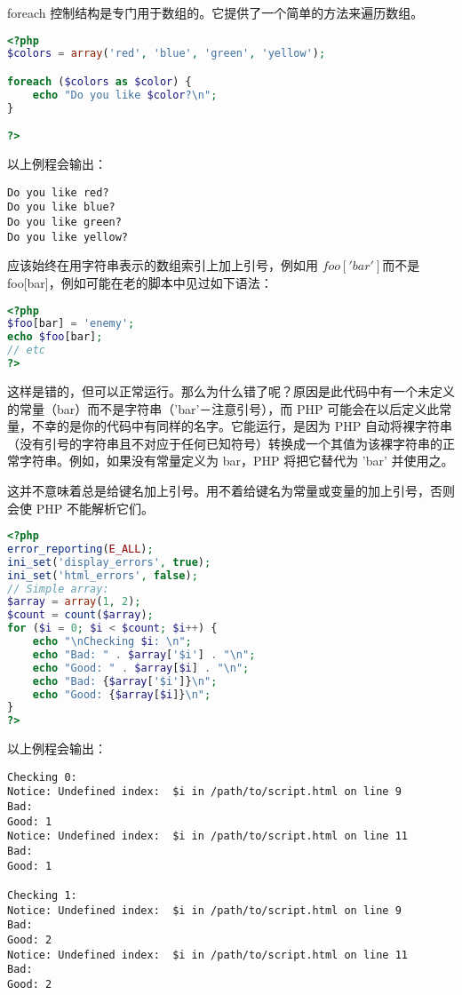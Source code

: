foreach 控制结构是专门用于数组的。它提供了一个简单的方法来遍历数组。

\begin{lstlisting}[language=PHP]
<?php
$colors = array('red', 'blue', 'green', 'yellow');

foreach ($colors as $color) {
    echo "Do you like $color?\n";
}

?>
\end{lstlisting}

以上例程会输出：


\begin{verbatim}
Do you like red?
Do you like blue?
Do you like green?
Do you like yellow?
\end{verbatim}

应该始终在用字符串表示的数组索引上加上引号，例如用 $foo['bar'] 而不是 $foo[bar]，例如可能在老的脚本中见过如下语法：

\begin{lstlisting}[language=PHP]
<?php
$foo[bar] = 'enemy';
echo $foo[bar];
// etc
?>
\end{lstlisting}


这样是错的，但可以正常运行。那么为什么错了呢？原因是此代码中有一个未定义的常量（bar）而不是字符串（'bar'－注意引号），而 PHP 可能会在以后定义此常量，不幸的是你的代码中有同样的名字。它能运行，是因为 PHP 自动将裸字符串（没有引号的字符串且不对应于任何已知符号）转换成一个其值为该裸字符串的正常字符串。例如，如果没有常量定义为 bar，PHP 将把它替代为 'bar' 并使用之。

这并不意味着总是给键名加上引号。用不着给键名为常量或变量的加上引号，否则会使 PHP 不能解析它们。

\begin{lstlisting}[language=PHP]
<?php
error_reporting(E_ALL);
ini_set('display_errors', true);
ini_set('html_errors', false);
// Simple array:
$array = array(1, 2);
$count = count($array);
for ($i = 0; $i < $count; $i++) {
    echo "\nChecking $i: \n";
    echo "Bad: " . $array['$i'] . "\n";
    echo "Good: " . $array[$i] . "\n";
    echo "Bad: {$array['$i']}\n";
    echo "Good: {$array[$i]}\n";
}
?>
\end{lstlisting}


以上例程会输出：


\begin{verbatim}
Checking 0: 
Notice: Undefined index:  $i in /path/to/script.html on line 9
Bad: 
Good: 1
Notice: Undefined index:  $i in /path/to/script.html on line 11
Bad: 
Good: 1

Checking 1: 
Notice: Undefined index:  $i in /path/to/script.html on line 9
Bad: 
Good: 2
Notice: Undefined index:  $i in /path/to/script.html on line 11
Bad: 
Good: 2
\end{verbatim}

